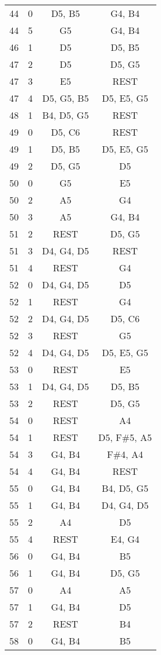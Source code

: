 \documentclass{article}
\begin{document}
\begin{longtable}{|c|c|c|c|}
\hline
44 & 0 & D5, B5 & G4, B4 \\ 
44 & 5 & G5 & G4, B4 \\ 
\hline
46 & 1 & D5 & D5, B5 \\ 
\hline
47 & 2 & D5 & D5, G5 \\ 
\hline
47 & 3 & E5 & REST \\ 
47 & 4 & D5, G5, B5 & D5, E5, G5 \\ 
\hline
48 & 1 & B4, D5, G5 & REST \\ 
\hline
49 & 0 & D5, C6 & REST \\ 
49 & 1 & D5, B5 & D5, E5, G5 \\ 
49 & 2 & D5, G5 & D5 \\ 
\hline
50 & 0 & G5 & E5 \\ 
50 & 2 & A5 & G4 \\ 
50 & 3 & A5 & G4, B4 \\ 
\hline
51 & 2 & REST & D5, G5 \\ 
51 & 3 & D4, G4, D5 & REST \\ 
51 & 4 & REST & G4 \\ 
\hline
52 & 0 & D4, G4, D5 & D5 \\ 
52 & 1 & REST & G4 \\ 
52 & 2 & D4, G4, D5 & D5, C6 \\ 
52 & 3 & REST & G5 \\ 
52 & 4 & D4, G4, D5 & D5, E5, G5 \\ 
\hline
53 & 0 & REST & E5 \\ 
53 & 1 & D4, G4, D5 & D5, B5 \\ 
53 & 2 & REST & D5, G5 \\ 
\hline
54 & 0 & REST & A4 \\ 
54 & 1 & REST & D5, F\#5, A5 \\ 
54 & 3 & G4, B4 & F\#4, A4 \\ 
54 & 4 & G4, B4 & REST \\ 
\hline
55 & 0 & G4, B4 & B4, D5, G5 \\ 
55 & 1 & G4, B4 & D4, G4, D5 \\ 
55 & 2 & A4 & D5 \\ 
55 & 4 & REST & E4, G4 \\ 
\hline
56 & 0 & G4, B4 & B5 \\ 
56 & 1 & G4, B4 & D5, G5 \\ 
\hline
57 & 0 & A4 & A5 \\ 
57 & 1 & G4, B4 & D5 \\ 
57 & 2 & REST & B4 \\ 
\hline
58 & 0 & G4, B4 & B5 \\ 

\end{longtable}
\end{document}
